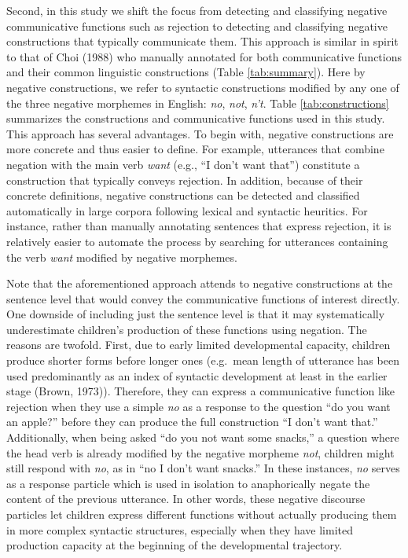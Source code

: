 \documentclass[
  english,
  man,floatsintext]{apa6}
\begin{document}
Second, in this study we shift the focus from detecting and classifying negative communicative functions such as rejection to detecting and classifying negative constructions that typically communicate them. This approach is similar in spirit to that of Choi (1988) who manually annotated for both communicative functions and their common linguistic constructions (Table \ref{tab:summary}). Here by negative constructions, we refer to syntactic constructions modified by any one of the three negative morphemes in English: \emph{no}, \emph{not}, \emph{n't}. Table \ref{tab:constructions} summarizes the constructions and communicative functions used in this study. This approach has several advantages. To begin with, negative constructions are more concrete and thus easier to define. For example, utterances that combine negation with the main verb \emph{want} (e.g., ``I don't want that'') constitute a construction that typically conveys rejection. In addition, because of their concrete definitions, negative constructions can be detected and classified automatically in large corpora following lexical and syntactic heuritics. For instance, rather than manually annotating sentences that express rejection, it is relatively easier to automate the process by searching for utterances containing the verb \emph{want} modified by negative morphemes.

Note that the aforementioned approach attends to negative constructions at the sentence level that would convey the communicative functions of interest directly. One downside of including just the sentence level is that it may systematically underestimate children's production of these functions using negation. The reasons are twofold. First, due to early limited developmental capacity, children produce shorter forms before longer ones (e.g.~mean length of utterance has been used predominantly as an index of syntactic development at least in the earlier stage (Brown, 1973)). Therefore, they can express a communicative function like rejection when they use a simple \emph{no} as a response to the question ``do you want an apple?'' before they can produce the full construction ``I don't want that.'' Additionally, when being asked ``do you not want some snacks,'' a question where the head verb is already modified by the negative morpheme \emph{not}, children might still respond with \emph{no}, as in ``no I don't want snacks.'' In these instances, \emph{no} serves as a response particle which is used in isolation to anaphorically negate the content of the previous utterance. In other words, these negative discourse particles let children express different functions without actually producing them in more complex syntactic structures, especially when they have limited production capacity at the beginning of the developmental trajectory.
\end{document}
